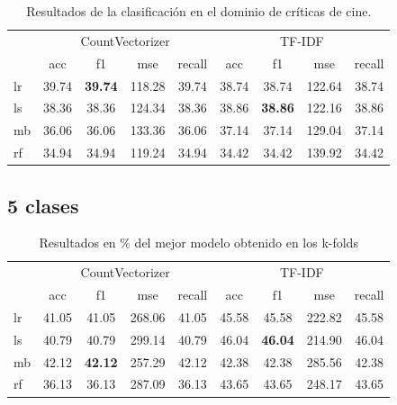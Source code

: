 \begin{table}[H]
	\centering
	\begin{tabular}{|l|cccc|cccc|}
		\hline
		& \multicolumn{4}{c|}{CountVectorizer} & \multicolumn{4}{c|}{TF-IDF} \\
		\cline{2-9}
		&    acc &     f1 &    mse &  recall & acc &     f1 &    mse &  recall \\
		\hline
		lr      &  39.74 &  \textbf{39.74} &  118.28 &   39.74 &  38.74 &  38.74 &  122.64 &   38.74\\
		ls      &  38.36 &  38.36 &  124.34 &   38.36 &  38.86 &  \textbf{38.86} &  122.16 &   38.86 \\
		mb      &  36.06 &  36.06 &  133.36 &   36.06 &  37.14 &  37.14 &  129.04 &   37.14 \\
		rf      &  34.94 &  34.94 &  119.24 &   34.94 &  34.42 &  34.42 &  139.92 &   34.42 \\
		\hline
	\end{tabular}
	\caption{Resultados de la clasificación en el dominio de críticas de cine.}
	\label{result-cv-test-3-clases-cine}
\end{table}

\subsection{5 clases}

\begin{table}[H]
	\centering
	\begin{tabular}{|l|cccc|cccc|}
		\hline
		& \multicolumn{4}{c|}{CountVectorizer} & \multicolumn{4}{c|}{TF-IDF} \\
		\cline{2-9}
		&    acc &     f1 &    mse &  recall & acc &     f1 &    mse &  recall \\
		\hline
		lr      &  41.05 &  41.05 &  268.06 &   41.05 &  45.58 &  45.58 &  222.82 &   45.58 \\
		ls      &  40.79 &  40.79 &  299.14 &   40.79 &  46.04 &  \textbf{46.04} &  214.90 &   46.04 \\
		mb      &  42.12 &  \textbf{42.12} &  257.29 &   42.12 &  42.38 &  42.38 &  285.56 &   42.38 \\
		rf      &  36.13 &  36.13 &  287.09 &   36.13 &  43.65 &  43.65 &  248.17 &   43.65 \\
		\hline
	\end{tabular}
	\caption{Resultados en \% del mejor modelo obtenido en los k-folds}
	\label{result-cv-test-5-clases}
\end{table}

